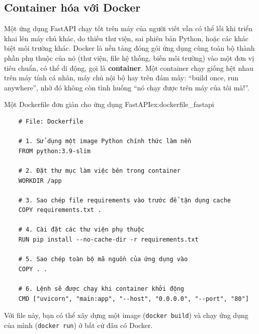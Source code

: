 \subsection{Container hóa với Docker}
\label{ssec:docker}
Một ứng dụng FastAPI chạy tốt trên máy của người viết vẫn có thể lỗi khi triển khai lên máy chủ khác, do thiếu thư viện, sai phiên bản Python, hoặc các khác biệt môi trường khác. Docker là nền tảng đóng gói ứng dụng cùng toàn bộ thành phần phụ thuộc của nó (thư viện, file hệ thống, biến môi trường) vào một đơn vị tiêu chuẩn, có thể di động, gọi là \textbf{container}. Một container chạy giống hệt nhau trên máy tính cá nhân, máy chủ nội bộ hay trên đám mây: “build once, run anywhere”, nhờ đó không còn tình huống “nó chạy được trên máy của tôi mà!”.
\begin{example}{Một Dockerfile đơn giản cho ứng dụng FastAPI}{ex:dockerfile_fastapi}
    \begin{verbatim}
    # File: Dockerfile

    # 1. Sử dụng một image Python chính thức làm nền
    FROM python:3.9-slim

    # 2. Đặt thư mục làm việc bên trong container
    WORKDIR /app

    # 3. Sao chép file requirements vào trước để tận dụng cache
    COPY requirements.txt .

    # 4. Cài đặt các thư viện phụ thuộc
    RUN pip install --no-cache-dir -r requirements.txt

    # 5. Sao chép toàn bộ mã nguồn của ứng dụng vào
    COPY . .

    # 6. Lệnh sẽ được chạy khi container khởi động
    CMD ["uvicorn", "main:app", "--host", "0.0.0.0", "--port", "80"]
    \end{verbatim}
\end{example}
Với file này, bạn có thể xây dựng một image (\texttt{docker build}) và chạy ứng dụng của mình (\texttt{docker run}) ở bất cứ đâu có Docker.
